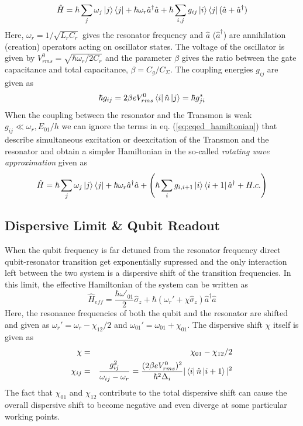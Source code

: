 \begin{equation}
\hat{H} = \hbar \sum\limits_j \omega_j \left| j \right>\left< j \right| + \hbar \omega_r \hat{a}^\dagger \hat{a} + \hbar \sum\limits_{i,j} g_{ij} \left| i \right>\left< j \right|(\hat{a}+\hat{a}^\dagger) \label{eq:cqed_hamiltonian}
\end{equation}
Here, $\omega_r = 1/\sqrt{L_r C_r}$ gives the resonator frequency and $\hat{a}$ ($\hat{a}^\dagger$) are annihilation (creation) operators acting on oscillator states. The voltage of the oscillator is given by $V_{rms}^0 = \sqrt{\hbar \omega_r / 2 C_r}$ and the parameter $\beta$ gives the ratio between the gate capacitance and total capacitance, $\beta = C_g/C_\Sigma$. The coupling energies $g_{ij}$ are given as
\begin{equation}
\hbar g_{ij} = 2\beta e V_{rms}^0 \left< i \right|\hat{n}\left| j \right> = \hbar g_{ji}^*
\end{equation}
When the coupling between the resonator and the Transmon is weak $g_{ij} \ll \omega_r,E_{01}/h$ we can ignore the terms in eq. (\ref{eq:cqed_hamiltonian}) that describe simultaneous excitation or deexcitation of the Transmon and the resonator and obtain a simpler Hamiltonian in the so-called {\it rotating wave approximation} given as
\begin{equation}
\hat{H} = \hbar \sum\limits_j \omega_j \left| j \right>\left< j \right|+\hbar \omega_r \hat{a}^\dagger \hat{a} + \left( \hbar \sum\limits_i g_{i,i+1} \left| i \right>\left< i+1 \right|\hat{a}^\dagger +H.c.\right)
\end{equation}

\subsection{Dispersive Limit \& Qubit Readout}

When the qubit frequency is far detuned from the resonator frequency direct qubit-resonator transition get exponentially supressed and the only interaction left between the two system is a dispersive shift of the transition frequencies. In this limit, the effective Hamiltonian of the system can be written as\citep{blais_cavity_2004,koch_charge-insensitive_2007}
\begin{equation}
\hat{H}_{eff} = \frac{\hbar \omega'_{01}}{2}\hat{\sigma}_z+\hbar(\omega_r' +\chi \hat{\sigma}_z)\hat{a}^\dagger \hat{a}
\end{equation}
Here, the resonance frequencies of both the qubit and the resonator are shifted and given as $\omega_r' = \omega_r-\chi_{12}/2$ and $\omega_{01}' = \omega_{01}+\chi_{01}$. The dispersive shift $\chi$ itself is given as
\begin{eqnarray}
\chi & = & \chi_{01}-\chi_{12}/2 \\
\chi_{ij} & = & \frac{g_{ij}^2}{\omega_{ij}-\omega_r} = \frac{(2\beta e V_{rms}^0)^2}{\hbar^2 \Delta_i}|\left< i \right|\hat{n}\left| i+1 \right>|^2
\end{eqnarray}
The fact that $\chi_{01}$ and $\chi_{12}$ contribute to the total dispersive shift can cause the overall dispersive shift to become negative and even diverge at some particular working points.

